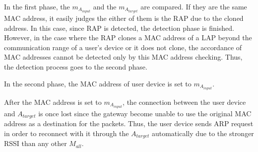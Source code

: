 \documentclass[conference]{IEEEtran}
\newcommand{\tarAP}{A_{target}}
\newcommand{\tarMAC}{m_{A_{target}}}
\newcommand{\inputMAC}{m_{A_{input}}}
\begin{document}
In the first phase, the $\inputMAC$ and the $\tarMAC$ are compared.
If they are the same MAC address, it easily judges the either of them is the RAP due to the cloned address.
In this case, since RAP is detected, the detection phase is finished.
However, in the case where the RAP clones a MAC address of a LAP beyond the communication range of a user's device or it does not clone, the accordance of MAC addresses cannot be detected only by this MAC address checking.
Thus, the detection process goes to the second phase.

In the second phase, the MAC address of user device is set to $\inputMAC$.

After the MAC address is set to $\inputMAC$, the connection between the user device and $\tarAP$ is once lost since the gateway become unable to use the original MAC address as a destination for the packets.
Thus, the user device sends ARP request in order to reconnect with it through the $\tarAP$ automatically due to the stronger RSSI than any other $M_{all}$.
\end{document}
